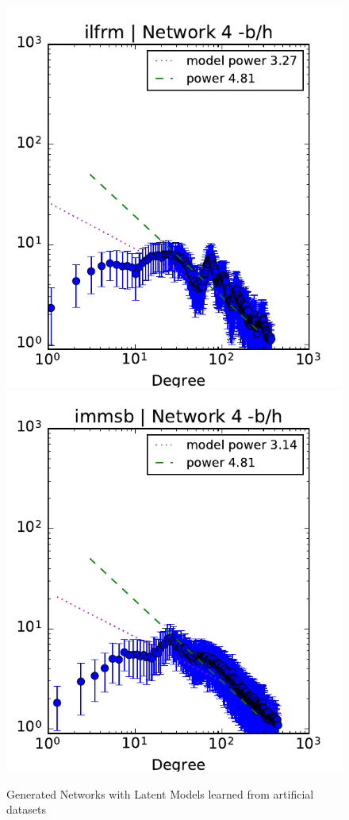 \begin{figure}[h]
	\endminipage
	\vspace{-0.4cm}
	\includegraphics[scale=0.4]{img/ilfrm_g4_d}
	\endminipage
	\includegraphics[scale=0.4]{img/immsb_g4_d}
	\endminipage
	
	\caption{Generated Networks with Latent Models learned from artificial datasets}
	\label{fig:gen_graph}
\end{figure}

